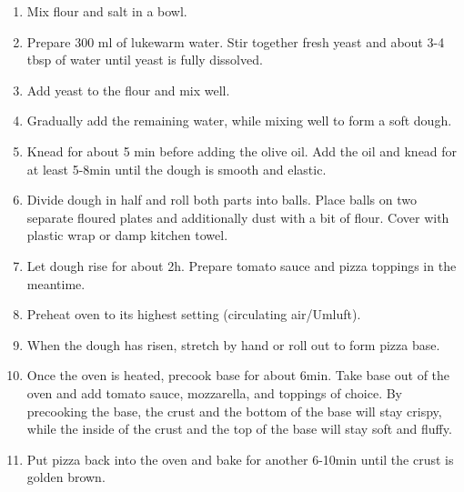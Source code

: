 \documentclass[
  10pt,
  a5paper,
  onecolumn,
  twoside]{article}
\begin{document}
\begin{enumerate}
\def\labelenumi{\arabic{enumi}.}
\item
  Mix flour and salt in a bowl.
\item
  Prepare 300 ml of lukewarm water. Stir together fresh yeast and about
  3-4 tbsp of water until yeast is fully dissolved.
\item
  Add yeast to the flour and mix well.
\item
  Gradually add the remaining water, while mixing well to form a soft
  dough.
\item
  Knead for about 5 min before adding the olive oil. Add the oil and
  knead for at least 5-8min until the dough is smooth and elastic.
\item
  Divide dough in half and roll both parts into balls. Place balls on
  two separate floured plates and additionally dust with a bit of flour.
  Cover with plastic wrap or damp kitchen towel.
\item
  Let dough rise for about 2h. Prepare tomato sauce and pizza toppings
  in the meantime.
\item
  Preheat oven to its highest setting (circulating air/Umluft).
\item
  When the dough has risen, stretch by hand or roll out to form pizza
  base.
\item
  Once the oven is heated, precook base for about 6min. Take base out of
  the oven and add tomato sauce, mozzarella, and toppings of choice. By
  precooking the base, the crust and the bottom of the base will stay
  crispy, while the inside of the crust and the top of the base will
  stay soft and fluffy.
\item
  Put pizza back into the oven and bake for another 6-10min until the
  crust is golden brown.
\end{enumerate}

\lipsum[11-15]

\renewcommand{\maketitle}{
  \thispagestyle{firstpage}  
    \begin{center}
      \Huge
      \textbf{Letter A}
      \par
      \vspace{0.50cm}
      \large
      \textbf{The letter A}
      \par
      \vspace{0.20cm}
      \small
      \textbf{The Alphabet}
      \par
      \vspace{0cm}
      \rule{0.4\textwidth}{0.5pt}
    \end{center}
}
\end{document}
